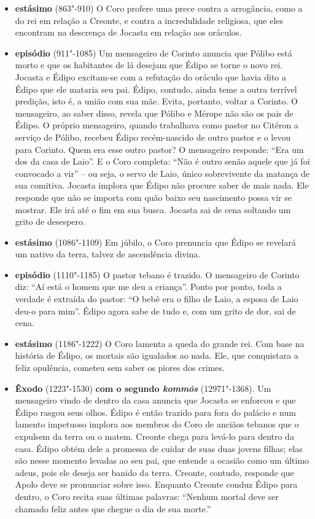 \begin{itemize}
\item \textbf{ estásimo} (863"-910) O Coro profere uma prece
contra a arrogância, como a do rei em relação a Creonte, e contra a
incredulidade religiosa, que eles encontram na descrença de Jocasta em
relação aos oráculos.

\item \textbf{ episódio} (911"-1085) Um mensageiro de
Corinto anuncia que Pólibo está morto e que os habitantes de lá desejam
que Édipo se torne o novo rei. Jocasta e Édipo excitam-se com a
refutação do oráculo que havia dito a Édipo que ele mataria seu pai.
Édipo, contudo, ainda teme a outra terrível predição, isto é, a união
com sua mãe. Evita, portanto, voltar a Corinto. O mensageiro, ao saber
disso, revela que Pólibo e Mérope não são os pais de Édipo. O próprio
mensageiro, quando trabalhava como pastor no Citéron a serviço de
Pólibo, recebeu Édipo recém-nascido de outro pastor e o levou para
Corinto. Quem era esse outro pastor? O mensageiro responde: ``Era um dos
da casa de Laio''. E o Coro completa: ``Não é outro senão aquele que já
foi convocado a vir'' -- ou seja, o servo de Laio, único sobrevivente da
matança de sua comitiva. Jocasta implora que Édipo não procure saber de
mais nada. Ele responde que não se importa com quão baixo seu nascimento
possa vir se mostrar. Ele irá até o fim em sua busca. Jocasta sai de
cena soltando um grito de desespero.

\item \textbf{ estásimo} (1086"-1109) Em júbilo, o Coro
prenuncia que Édipo se revelará um nativo da terra, talvez de
ascendência divina.

\item \textbf{ episódio} (1110"-1185) O pastor tebano é
trazido. O mensageiro de Corinto diz: ``Aí está o homem que me deu a
criança''. Ponto por ponto, toda a verdade é extraída do pastor: ``O
bebê era o filho de Laio, a esposa de Laio deu-o para mim''. Édipo agora
sabe de tudo e, com um grito de dor, sai de cena.

\item \textbf{ estásimo} (1186"-1222) O Coro lamenta a queda
do grande rei. Com base na história de Édipo, os mortais são igualados
ao nada. Ele, que conquistara a feliz opulência, cometeu sem saber os
piores dos crimes.

\item \textbf{Êxodo} (1223"-1530) \textbf{com o segundo \emph{kommós}}
(12971"-1368). Um mensageiro vindo de dentro da casa anuncia que Jocasta
se enforcou e que Édipo rasgou seus olhos. Édipo é então trazido para
fora do palácio e num lamento impetuoso implora aos membros do Coro de
anciãos tebanos que o expulsem da terra ou o matem. Creonte chega para
levá-lo para dentro da casa. Édipo obtém dele a promessa de cuidar de
suas duas jovens filhas; elas são nesse momento levadas ao seu pai, que
entende a ocasião como um último adeus, pois ele deseja ser banido da
terra. Creonte, contudo, responde que Apolo deve se pronunciar sobre
isso. Enquanto Creonte conduz Édipo para dentro, o Coro recita suas
últimas palavras: ``Nenhum mortal deve ser chamado feliz antes que
chegue o dia de sua morte.''
\end{itemize}